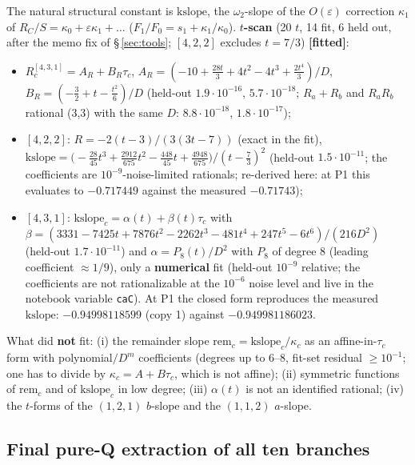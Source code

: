 \documentclass[10pt]{article}
\newcommand{\nb}[1]{\texttt{#1}}
\begin{document}
The natural structural constant is $\mathrm{kslope}$, the $\omega_2$-slope of the $O(\varepsilon)$ correction $\kappa_1$ of $R_C/S=\kappa_0+\varepsilon\kappa_1+\dots$ ($F_1/F_0=s_1+\kappa_1/\kappa_0$). \textbf{$t$-scan} (20 $t$, 14 fit, 6 held out, after the memo fix of \S\,\ref{sec:tools}; $[4,2,2]$ excludes $t=7/3$) \textbf{[fitted]}:

\begin{itemize}\setlength{\itemsep}{1pt}
\item $R_c^{[4,3,1]}=A_R+B_R\tau_c$, $A_R=(-10+\frac{28t}3+4t^2-4t^3+\frac{2t^4}3)/D$, $B_R=(-\frac32+t-\frac{t^2}6)/D$ (held-out $1.9\cdot10^{-16}$, $5.7\cdot10^{-18}$; $R_a+R_b$ and $R_aR_b$ rational (3,3) with the same $D$: $8.8\cdot10^{-18}$, $1.8\cdot10^{-17}$);
\item $[4,2,2]$: $R=-2(t-3)/(3(3t-7))$ (exact in the fit), $\mathrm{kslope}=\bigl(-\tfrac{28}{45}t^3+\tfrac{2912}{675}t^2-\tfrac{448}{45}t+\tfrac{4948}{675}\bigr)/(t-\tfrac73)^2$ (held-out $1.5\cdot10^{-11}$; the coefficients are $10^{-9}$-noise-limited rationals; re-derived here: at P1 this evaluates to $-0.717449$ against the measured $-0.71743$);
\item $[4,3,1]$: $\mathrm{kslope}_c=\alpha(t)+\beta(t)\tau_c$ with $\beta=(3331-7425t+7876t^2-2262t^3-481t^4+247t^5-6t^6)/(216D^2)$ (held-out $1.7\cdot10^{-11}$) and $\alpha=P_8(t)/D^2$ with $P_8$ of degree 8 (leading coefficient $\approx1/9$), only a \textbf{numerical} fit (held-out $10^{-9}$ relative; the coefficients are not rationalizable at the $10^{-6}$ noise level and live in the notebook variable \nb{caC}). At P1 the closed form reproduces the measured $\mathrm{kslope}$: $-0.94998118599$ (copy 1) against $-0.949981186023$.
\end{itemize}

What did \textbf{not} fit: (i) the remainder slope $\mathrm{rem}_c=\mathrm{kslope}_c/\kappa_c$ as an affine-in-$\tau_c$ form with polynomial$/D^m$ coefficients (degrees up to 6--8, fit-set residual $\ge10^{-1}$; one has to divide by $\kappa_c=A+B\tau_c$, which is not affine); (ii) symmetric functions of $\mathrm{rem}_c$ and of $\mathrm{kslope}_c$ in low degree; (iii) $\alpha(t)$ is not an identified rational; (iv) the $t$-forms of the $(1,2,1)$ $b$-slope and the $(1,1,2)$ $a$-slope.

\subsection{Final pure-Q extraction of all ten branches}\label{sec:a310F}
\end{document}
